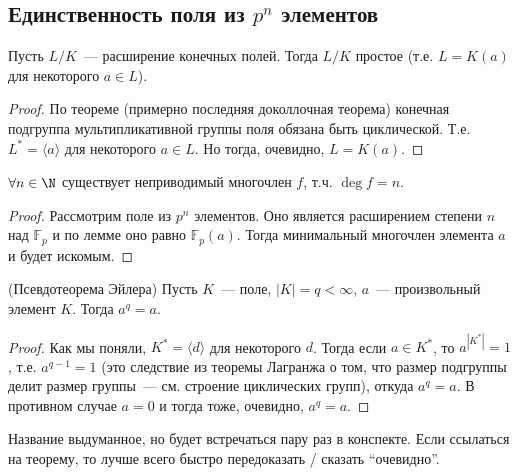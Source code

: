 \subsection{Единственность поля из $p^n$ элементов}
\begin{lemma}
    Пусть $L/K$~--- расширение конечных полей.
    Тогда $L/K$ простое (т.е. $L=K(a)$ для некоторого $a\in L$).
\end{lemma}
\begin{proof}
    По теореме (примерно последняя доколлочная теорема) конечная подгруппа мультипликативной группы поля обязана быть циклической.
    Т.е. $L^* = \langle a \rangle$ для некоторого $a\in L$.
    Но тогда, очевидно, $L=K(a)$.
\end{proof}
\follow $\forall n\in \N$ существует неприводимый многочлен $f$, т.ч. $\deg f = n$.
\begin{proof}
    Рассмотрим поле из $p^n$ элементов.
    Оно является расширением степени $n$ над $\mathbb{F}_p$ и по лемме оно равно $\mathbb{F}_p(a)$.
    Тогда минимальный многочлен элемента $a$ и будет искомым.
\end{proof}

\begin{theorem}(Псевдотеорема Эйлера)
    Пусть $K$~--- поле, $|K|=q<\infty$, $a$~--- произвольный элемент $K$.
    Тогда $a^q=a$.
\end{theorem}
\begin{proof}
    Как мы поняли, $K^* = \langle d\rangle$ для некоторого $d$.
    Тогда если $a\in K^*$, то $a^{|K^*|}=1$, т.е. $a^{q-1}=1$ (это следствие из теоремы Лагранжа о том, что размер подгруппы делит размер группы~--- см. строение циклических групп), откуда $a^q=a$.
    В противном случае $a=0$ и тогда тоже, очевидно, $a^q=a$.
\end{proof}
\notice Название выдуманное, но будет встречаться пару раз в конспекте.
Если ссылаться на теорему, то лучше всего быстро передоказать / сказать ``очевидно''.

